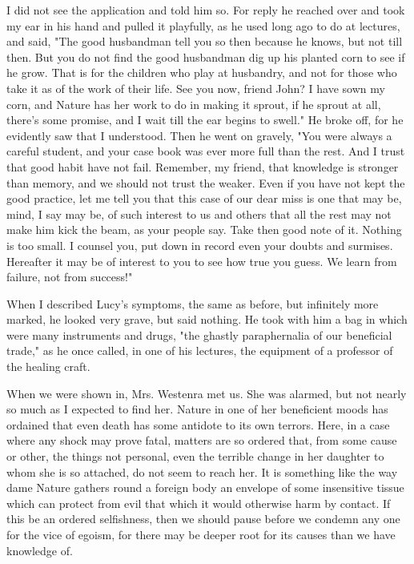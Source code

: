 I did not see the application and told him so. For reply he reached over and took my ear in his hand and pulled it playfully, as he used long ago to do at lectures, and said, "The good husbandman tell you so then because he knows, but not till then. But you do not find the good husbandman dig up his planted corn to see if he grow. That is for the children who play at husbandry, and not for those who take it as of the work of their life. See you now, friend John? I have sown my corn, and Nature has her work to do in making it sprout, if he sprout at all, there's some promise, and I wait till the ear begins to swell." He broke off, for he evidently saw that I understood. Then he went on gravely, "You were always a careful student, and your case book was ever more full than the rest. And I trust that good habit have not fail. Remember, my friend, that knowledge is stronger than memory, and we should not trust the weaker. Even if you have not kept the good practice, let me tell you that this case of our dear miss is one that may be, mind, I say may be, of such interest to us and others that all the rest may not make him kick the beam, as your people say. Take then good note of it. Nothing is too small. I counsel you, put down in record even your doubts and surmises. Hereafter it may be of interest to you to see how true you guess. We learn from failure, not from success!" 

When I described Lucy's symptoms, the same as before, but infinitely more marked, he looked very grave, but said nothing. He took with him a bag in which were many instruments and drugs, "the ghastly paraphernalia of our beneficial trade," as he once called, in one of his lectures, the equipment of a professor of the healing craft. 

When we were shown in, Mrs. Westenra met us. She was alarmed, but not nearly so much as I expected to find her. Nature in one of her beneficient moods has ordained that even death has some antidote to its own terrors. Here, in a case where any shock may prove fatal, matters are so ordered that, from some cause or other, the things not personal, even the terrible change in her daughter to whom she is so attached, do not seem to reach her. It is something like the way dame Nature gathers round a foreign body an envelope of some insensitive tissue which can protect from evil that which it would otherwise harm by contact. If this be an ordered selfishness, then we should pause before we condemn any one for the vice of egoism, for there may be deeper root for its causes than we have knowledge of. 


